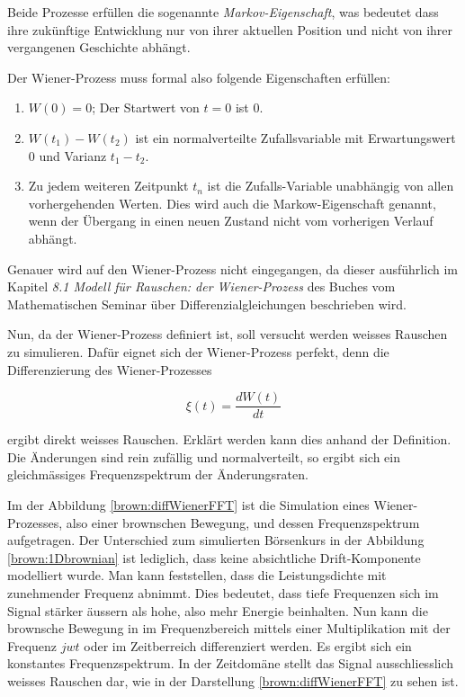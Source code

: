 Beide Prozesse erfüllen die sogenannte \textit{Markov-Eigenschaft}, was bedeutet dass ihre zukünftige Entwicklung nur von ihrer aktuellen Position und nicht von ihrer vergangenen Geschichte abhängt.

Der Wiener-Prozess muss formal also folgende Eigenschaften erfüllen: 

\begin{enumerate}
	\item $ W(0) = 0 $; Der Startwert von $ t = 0 $ ist 0.
	\item $ W(t_{1}) - W(t_{2}) $ ist ein normalverteilte Zufallsvariable mit Erwartungswert 0 und Varianz $ t_{1} - t_{2} $.
	\item Zu jedem weiteren Zeitpunkt $ t_{n} $ ist die Zufalls-Variable unabhängig von allen vorhergehenden Werten. Dies wird auch die Markow-Eigenschaft genannt, wenn der Übergang in einen neuen Zustand nicht vom vorherigen Verlauf abhängt.
\end{enumerate}

Genauer wird auf den Wiener-Prozess nicht eingegangen, da dieser ausführlich im Kapitel \textit{8.1 Modell für Rauschen: der Wiener-Prozess} des Buches \cite{brown:Differenzialgleichungen} vom Mathematischen Seminar über Differenzialgleichungen beschrieben wird.


Nun, da der Wiener-Prozess definiert ist, soll versucht werden weisses Rauschen zu simulieren. Dafür eignet sich der Wiener-Prozess perfekt, denn die Differenzierung des Wiener-Prozesses

\begin{equation}
	\xi(t) = \frac{dW(t)}{dt}
\end{equation}

ergibt direkt weisses Rauschen. Erklärt werden kann dies anhand der Definition. Die Änderungen sind rein zufällig und normalverteilt, so ergibt sich ein gleichmässiges Frequenzspektrum der Änderungsraten.


Im der Abbildung \ref{brown:diffWienerFFT} ist die Simulation eines Wiener-Prozesses, also einer brownschen Bewegung, und dessen Frequenzspektrum aufgetragen. Der Unterschied zum simulierten Börsenkurs in der Abbildung \ref{brown:1Dbrownian} ist lediglich, dass keine absichtliche Drift-Komponente modelliert wurde. Man kann feststellen, dass die Leistungsdichte mit zunehmender Frequenz abnimmt. Dies bedeutet, dass tiefe Frequenzen sich im Signal stärker äussern als hohe, also mehr Energie beinhalten. Nun kann die brownsche Bewegung in im Frequenzbereich mittels einer Multiplikation mit der Frequenz $ jwt $ oder im Zeitberreich differenziert werden. Es ergibt sich ein konstantes Frequenzspektrum. In der Zeitdomäne stellt das Signal ausschliesslich weisses Rauschen dar, wie in der Darstellung \ref{brown:diffWienerFFT} zu sehen ist.

